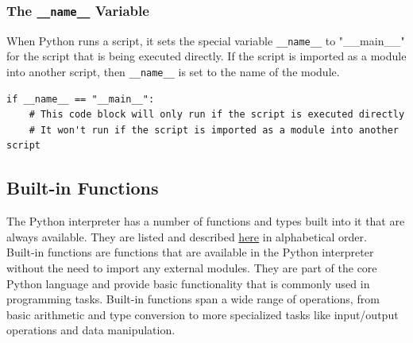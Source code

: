 \subsubsection{The \texttt{\_\_name\_\_} Variable}
When Python runs a script, it sets the special variable \texttt{\_\_name\_\_} to "\_\_main\_\_" for the script that is being executed directly. If the script is imported as a module into another script, then \texttt{\_\_name\_\_} is set to the name of the module.

\begin{codebox}
\begin{verbatim}
if __name__ == "__main__":
    # This code block will only run if the script is executed directly
    # It won't run if the script is imported as a module into another script
\end{verbatim}
\end{codebox}


\newpage
\subsection{Built-in Functions}
The Python interpreter has a number of functions and types built into it that are always available. They are listed and described \href{https://docs.python.org/3/library/functions.html}{here} in alphabetical order.\\

Built-in functions are functions that are available in the Python interpreter without the need to import any external modules. They are part of the core Python language and provide basic functionality that is commonly used in programming tasks. Built-in functions span a wide range of operations, from basic arithmetic and type conversion to more specialized tasks like input/output operations and data manipulation.


